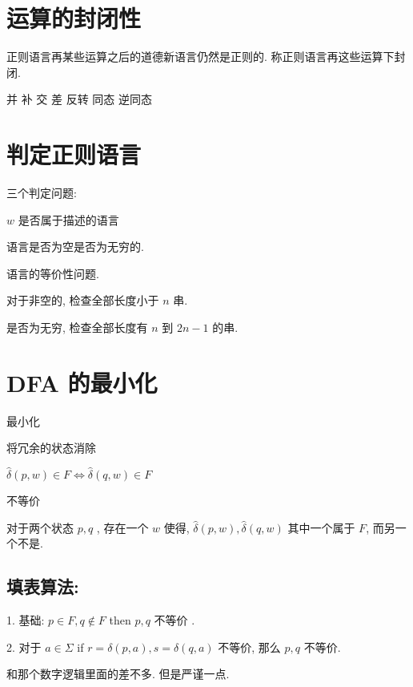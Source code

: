 \documentclass[../main.tex]{subfiles}
\begin{document}
\section{运算的封闭性}\label{sec:feng}
正则语言再某些运算之后的道德新语言仍然是正则的. 
称正则语言再这些运算下封闭. 

并
补
交
差
反转
同态
逆同态



\section{判定正则语言}\label{sec:panding}

三个判定问题: 

\(w\) 是否属于描述的语言

语言是否为空是否为无穷的. 

语言的等价性问题. 

对于非空的, 检查全部长度小于 \(n\) 串. 

是否为无穷, 检查全部长度有 \(n\) 到 \(2 n - 1\) 的串. 


\section{DFA 的最小化}\label{sec:}

最小化

将冗余的状态消除

\(\hat\delta (p , w ) \in F \iff\hat\delta ( q , w ) \in F\)

不等价

对于两个状态 \(p, q\) , 存在一个 \(w\) 使得, \( \hat{\delta} (p , w )  , \hat\delta (q, w )\) 其中一个属于 \(F\), 而另一个不是. 

\subsection{填表算法:}\label{sse:table}
1. 基础: \( p \in F , q \notin F\) then \(p , q \) 不等价 .

2. 对于 \(a \in \Sigma\)  if \( r =\delta (p , a ) , s =\delta (q , a ) \) 不等价, 那么 \(p, q \) 不等价. 

和那个数字逻辑里面的差不多. 但是严谨一点.
\end{document}
